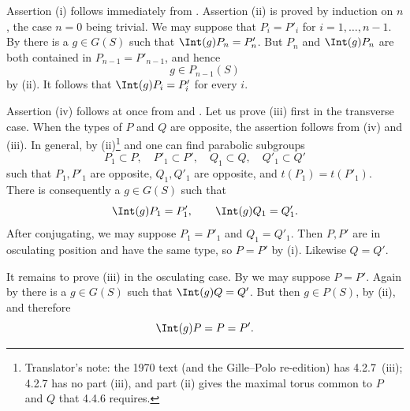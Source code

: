 \SGAProof
Assertion \textup{(i)} follows immediately from .  Assertion
\textup{(ii)} is proved by induction on \(n\), the case \(n=0\)
being trivial.  We may suppose that \(P_i=P'_i\) for
\(i=1,\ldots,n-1\).  By  there is a \(g\in G(S)\) such that
\(\Int(g)P_n=P'_n\).  But \(P_n\) and \(\Int(g)P_n\) are both
contained in \(P_{n-1}=P'_{n-1}\), and hence
\[
 g\in P_{n-1}(S)
\]
by \textup{(ii)}.  It follows that
\(\Int(g)P_i=P'_i\) for every \(i\).

Assertion \textup{(iv)} follows at once from  and .  Let us
prove \textup{(iii)} first in the transverse case.  When the types of
\(P\) and \(Q\) are opposite, the assertion follows from
\textup{(iv)} and \textup{(iii)}.  In general, by
\textup{(ii)}\footnote{Translator's note: the 1970 text (and the Gille--Polo re-edition) has
4.2.7~(iii); 4.2.7 has no part (iii), and part (ii) gives the maximal torus
common to \(P\) and \(Q\) that 4.4.6 requires.} and  one can find parabolic subgroups
\[
 P_1\subset P,\quad P'_1\subset P',\quad
 Q_1\subset Q,\quad Q'_1\subset Q'
\]
such that \(P_1,P'_1\) are opposite, \(Q_1,Q'_1\) are opposite, and
\(t(P_1)=t(P'_1)\).  There is consequently a \(g\in G(S)\) such that
\[
 \Int(g)P_1=P'_1,\qquad\Int(g)Q_1=Q'_1.
\]
After conjugating, we may suppose \(P_1=P'_1\) and \(Q_1=Q'_1\).
Then \(P,P'\) are in osculating position and have the same type, so
\(P=P'\) by \textup{(i)}.  Likewise \(Q=Q'\).

It remains to prove \textup{(iii)} in the osculating case.  By 
we may suppose \(P=P'\).  Again by  there is a \(g\in G(S)\) such
that \(\Int(g)Q=Q'\).  But then \(g\in P(S)\), by
\textup{(ii)}, and therefore
\[
 \Int(g)P=P=P'.
\]
\SGAQED
